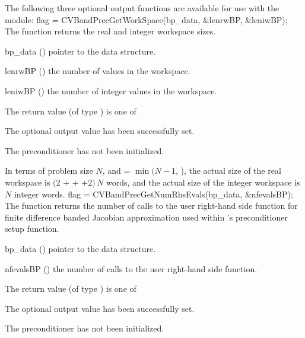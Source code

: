 The following three optional output functions are available for use with 
the {\cvbandpre} module:
{
  flag = CVBandPrecGetWorkSpace(bp\_data, \&lenrwBP, \&leniwBP);
}
{
  The function  returns the
  {\cvbandpre} real and integer workspace sizes.
}
{
  \begin{args}[lenrwBP]
  \item[bp\_data] ()
    pointer to the {\cvbandpre} data structure.
  \item[lenrwBP] ()
    the number of  values in the {\cvbandpre} workspace.
  \item[leniwBP] ()
    the number of integer values in the {\cvbandpre} workspace.
  \end{args}
}
{
  The return value  (of type ) is one of
  \begin{args}
  \item[\Id{CV\_SUCCESS}] 
    The optional output value has been successfully set.
  \item[\Id{CV\_PDATA\_NULL}]
    The {\cvbandpre} preconditioner has not been initialized.
  \end{args}
}
{
  In terms of problem size $N$, and  = $\min(N-1,\,$),
  the actual size of the real workspace is
  $(2$  $+$  $+$  $+2)\, N$  words,
  and the actual size of the integer workspace is $N$ integer words.
}
{
  flag = CVBandPrecGetNumRhsEvals(bp\_data, \&nfevalsBP);
}
{
  The function  returns the
  number of calls to the user right-hand side function for
  finite difference banded Jacobian approximation used within
  {\cvbandpre}'s preconditioner setup function.
}
{
  \begin{args}[nfevalsBP]
  \item[bp\_data] ()
    pointer to the {\cvbandpre} data structure.
  \item[nfevalsBP] ()
    the number of calls to the user right-hand side function.
  \end{args}
}
{
  The return value  (of type ) is one of
  \begin{args}
  \item[\Id{CV\_SUCCESS}] 
    The optional output value has been successfully set.
  \item[\Id{CV\_PDATA\_NULL}]
    The {\cvbandpre} preconditioner has not been initialized.
  \end{args}
}
{}

